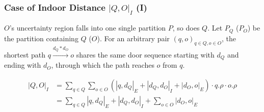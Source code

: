 
\begin{frame}
\frametitle{Case of Indoor Distance $|Q, O|_I$ (I)}

 \quad $O$'s uncertainty region falls into one single partition $P$, so does $Q$. Let $P_Q$ ($P_O$) be the partition containing $Q$ ($O$). For an arbitrary pair $(q, o)_{q \in Q, o \in O}$, the shortest path $q \overset{d_Q*d_O}{\rightarrow} o$ shares the same door sequence starting with $d_Q$ and ending with $d_O$, through which the path reaches $o$ from $q$.

\begin{equation}
  \begin{split}
  |Q, O|_{I} & = \sum_{q \in Q}\sum_{o \in O} (|q, d_Q|_E + |d_Q, d_O|_I + |d_O, o|_E)\cdot q.\rho \cdot o.\rho \\
             & = \sum_{q \in Q} |q, d_Q|_E + |d_Q, d_O|_I + \sum_{o \in O} |d_O, o|_E
  \end{split}
\end{equation}

\end{frame}


